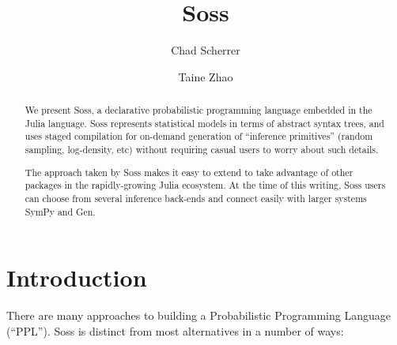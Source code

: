 \documentclass[anonymous=false, %
               format=acmsmall, %
               review=true, %
               screen=true, %
               nonacm=true]{acmart}
\begin{document}
\title{Soss}

\author{Chad Scherrer}

\author{Taine Zhao}

\begin{abstract}
We present Soss, a declarative probabilistic programming language embedded in the Julia language. Soss represents statistical models in terms of abstract syntax trees, and uses staged compilation for on-demand generation of ``inference primitives'' (random sampling, log-density, etc) without requiring casual users to worry about such details.

The approach taken by Soss makes it easy to extend to take advantage of other packages in the rapidly-growing Julia ecosystem. At the time of this writing, Soss users can choose from several inference back-ends and connect easily with larger systems SymPy and Gen.
\end{abstract}

\maketitle

\section{Introduction}

There are many approaches to building a Probabilistic Programming Language (``PPL''). Soss is distinct from most alternatives in a number of ways:
\end{document}
